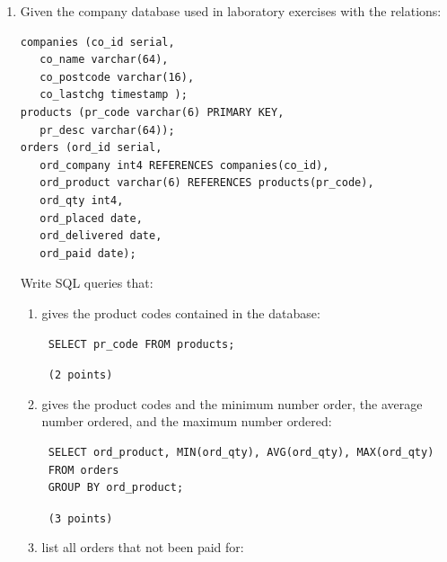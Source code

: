 \documentclass[12pt]{article}
\begin{document}
\begin{enumerate}
\begin{enumerate}
{	Decomposing around the BCNF violation, C $\rightarrow$ D,
	gives the smaller relations wtih functional dependencies:
	$$
	\begin{array}{ll}
	R_1(C,D) & R_2(C,A,B)\\
	C \rightarrow D & AB \rightarrow C\\
				& C   \rightarrow A\\
	\end{array}
	$$
	The key for $R_1$ is C, so $R_1$ is in BCNF.\\
	The key for $R_2$ is AB, so C $\rightarrow$ A is a BCNF violation.
	Decomposing $R_2$ gives:
	$$
	\begin{array}{ll}
	R_3(C,A) & R_4(C,B)\\
	C \rightarrow A & \\
	\end{array}
	$$
	
	(3 points total.)
	}
\end{enumerate}

\item Given the company database used in laboratory exercises with
the relations:
\begin{verbatim}companies (co_id serial,
   co_name varchar(64),
   co_postcode varchar(16),
   co_lastchg timestamp );
products (pr_code varchar(6) PRIMARY KEY,
   pr_desc varchar(64));
orders (ord_id serial,
   ord_company int4 REFERENCES companies(co_id),
   ord_product varchar(6) REFERENCES products(pr_code),
   ord_qty int4,
   ord_placed date,
   ord_delivered date,
   ord_paid date);\end{verbatim}
Write SQL queries that:
\begin{enumerate}
   \item gives the product codes contained in the database:
 
 \begin{verbatim}
 SELECT pr_code FROM products;\end{verbatim}  	
	{\tt
	(2 points)
	}
	
   \item gives the product codes and the minimum number order, 
	the average number ordered, and the maximum number ordered:
	
 \begin{verbatim}
 SELECT ord_product, MIN(ord_qty), AVG(ord_qty), MAX(ord_qty) 
 FROM orders
 GROUP BY ord_product; \end{verbatim}  		
	{\tt
	(3 points)
	}
	
   \item list all orders that not been paid for:
	

\end{enumerate}
\end{enumerate}
\end{document}
